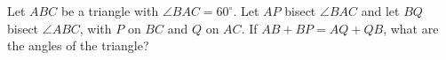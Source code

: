 Let $ABC$ be a triangle with $\angle BAC = 60^\circ$. Let $AP$ bisect $\angle BAC$ and let $BQ$ bisect $\angle ABC$, with $P$ on $BC$ and $Q$ on $AC$. If $AB + BP = AQ + QB$, what are the angles of the triangle?
